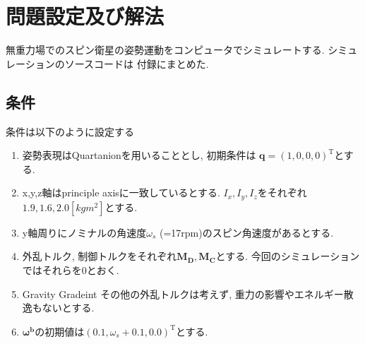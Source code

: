 \documentclass[class=article, crop=false, dvipdfmx, fleqn]{standalone}
\begin{document}
\section{問題設定及び解法}
無重力場でのスピン衛星の姿勢運動をコンピュータでシミュレートする. シミュレーションのソースコードは
付録にまとめた.

\subsection{条件}
条件は以下のように設定する
\begin{enumerate}
  \item 姿勢表現はQuartanionを用いることとし, 初期条件は $\bm{q} = {(1, 0, 0, 0)}^{\mathrm{T}}$とする.
  \item x,y,z軸はprinciple axisに一致しているとする. $I_x, I_y, I_z$をそれぞれ$1.9,1.6,2.0 [kgm^2]$とする.
  \item y軸周りにノミナルの角速度$\omega_s$ (=17rpm)のスピン角速度があるとする.
  \item 外乱トルク, 制御トルクをそれぞれ$\bm{M_D},\bm{M_C}$とする. 今回のシミュレーションではそれらを0とおく.
  \item Gravity Gradeint その他の外乱トルクは考えず, 重力の影響やエネルギー散逸もないとする.
  \item $\bm{\omega^b}$の初期値は${(0.1,\omega_s +0.1, 0.0)}^{\mathrm{T}}$とする.
\end{enumerate}
\end{document}
